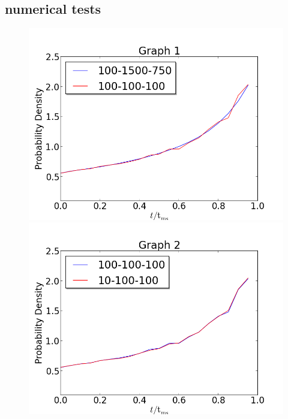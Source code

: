 \documentclass[a4paper,10pt]{article}
\begin{document}
 \subsection{numerical tests}
 \begin{figure}[h!]
  \begin{minipage}{0.49\textwidth}
   \includegraphics[width=\textwidth]{100-100-100}
  \end{minipage}
  \begin{minipage}{0.49\textwidth}
   \includegraphics[width=\textwidth]{10-100-100}
  \end{minipage}
  \begin{minipage}{0.49\textwidth}

\end{minipage}
\end{figure}
\end{document}
